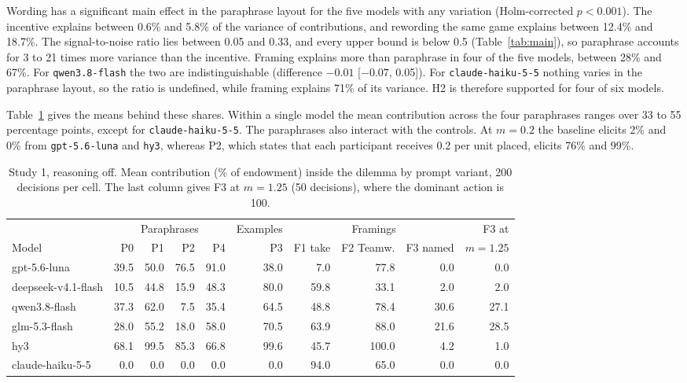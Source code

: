 \documentclass[runningheads]{llncs}
\begin{document}
Wording has a significant main effect in the paraphrase layout for the five models with any variation (Holm-corrected $p<0.001$). The incentive explains between 0.6\% and 5.8\% of the variance of contributions, and rewording the same game explains between 12.4\% and 18.7\%. The signal-to-noise ratio lies between 0.05 and 0.33, and every upper bound is below 0.5 (Table~\ref{tab:main}), so paraphrase accounts for 3 to 21 times more variance than the incentive. Framing explains more than paraphrase in four of the five models, between 28\% and 67\%. For \texttt{qwen3.8-flash} the two are indistinguishable (difference $-0.01$ [$-0.07$, 0.05]). For \texttt{claude-haiku-5-5} nothing varies in the paraphrase layout, so the ratio is undefined, while framing explains 71\% of its variance. H2 is therefore supported for four of six models.

Table~\ref{tab:variants} gives the means behind these shares. Within a single model the mean contribution across the four paraphrases ranges over 33 to 55 percentage points, except for \texttt{claude-haiku-5-5}. The paraphrases also interact with the controls. At $m=0.2$ the baseline elicits 2\% and 0\% from \texttt{gpt-5.6-luna} and \texttt{hy3}, whereas P2, which states that each participant receives 0.2 per unit placed, elicits 76\% and 99\%.

\begin{table}[t]
\caption{Study 1, reasoning off. Mean contribution (\% of endowment) inside the dilemma by prompt variant, 200 decisions per cell. The last column gives F3 at $m=1.25$ (50 decisions), where the dominant action is 100.}
\label{tab:variants}
\centering
\scriptsize
\setlength{\tabcolsep}{3.2pt}
\begin{tabular}{@{}l rrrr r rrr r@{}}
\toprule
 & \multicolumn{4}{c}{Paraphrases} & Examples & \multicolumn{3}{c}{Framings} & F3 at \\
\cmidrule(lr){2-5}\cmidrule(lr){6-6}\cmidrule(lr){7-9}
Model & P0 & P1 & P2 & P4 & P3 & F1 take & F2 Teamw. & F3 named & $m{=}1.25$ \\
\midrule
gpt-5.6-luna & 39.5 & 50.0 & 76.5 & 91.0 & 38.0 & 7.0 & 77.8 & 0.0 & 0.0 \\
deepseek-v4.1-flash & 10.5 & 44.8 & 15.9 & 48.3 & 80.0 & 59.8 & 33.1 & 2.0 & 2.0 \\
qwen3.8-flash & 37.3 & 62.0 & 7.5 & 35.4 & 64.5 & 48.8 & 78.4 & 30.6 & 27.1 \\
glm-5.3-flash & 28.0 & 55.2 & 18.0 & 58.0 & 70.5 & 63.9 & 88.0 & 21.6 & 28.5 \\
hy3 & 68.1 & 99.5 & 85.3 & 66.8 & 99.6 & 45.7 & 100.0 & 4.2 & 1.0 \\
claude-haiku-5-5 & 0.0 & 0.0 & 0.0 & 0.0 & 0.0 & 94.0 & 65.0 & 0.0 & 0.0 \\
\bottomrule
\end{tabular}
\end{table}
\end{document}
